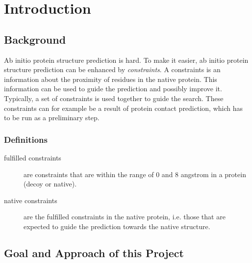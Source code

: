 \documentclass[a4paper, 11pt, parskip=half]{scrartcl}
\title{\titleString}
\author{David Lassner}
\author{Moritz Neeb}
\affil{\groupName}
\begin{document}
\maketitle



\section{Introduction}

\subsection{Background}

Ab initio protein structure prediction is hard.
To make it easier, ab initio protein structure prediction
can be enhanced by \emph{constraints}.
A constraints is an information about the proximity of residues in the native protein.
This information can be used to guide the prediction and possibly improve it.
Typically, a set of constraints is used together to guide the search.
These constraints can for example be a result of protein contact prediction,
which has to be run as a preliminary step.

\subsubsection*{Definitions}
\begin{description}
	\item[fulfilled constraints] are constraints that are within the range of $0$ and $8$ angstrom in a protein (decoy or native).
	\item[native constraints] are the fulfilled constraints in the native protein,
	i.e. those that are expected to guide the prediction towards the native structure.
\end{description}

\subsection{Goal and Approach of this Project}
\end{document}
